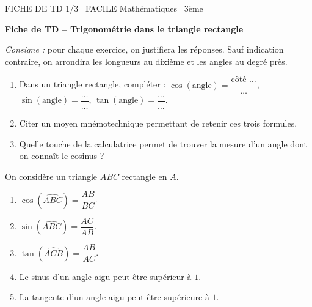 \documentclass[11pt]{article}
\begin{document}
\begin{tcolorbox}[enhanced,colback=popink,colframe=popink,arc=10pt,boxrule=0pt,left=12pt,right=12pt,top=9pt,bottom=9pt]
{\color{white}\popxbold\small FICHE DE TD 1/3 \textbullet\ FACILE \hfill Mathématiques \textbullet\ 3ème\par}
\end{tcolorbox}
\vspace{4pt}
\textbf{Fiche de TD -- Trigonométrie dans le triangle rectangle}

\emph{Consigne :} pour chaque exercice, on justifiera les réponses. Sauf indication contraire, on arrondira les longueurs au dixième et les angles au degré près.

\begin{exercice}
\begin{enumerate}
  \item Dans un triangle rectangle, compléter : $\cos(\text{angle}) = \dfrac{\text{côté \ldots}}{\text{\ldots}}$, $\sin(\text{angle}) = \dfrac{\text{\ldots}}{\text{\ldots}}$, $\tan(\text{angle}) = \dfrac{\text{\ldots}}{\text{\ldots}}$.
  \item Citer un moyen mnémotechnique permettant de retenir ces trois formules.
  \item Quelle touche de la calculatrice permet de trouver la mesure d'un angle dont on connaît le cosinus ?
\end{enumerate}
\end{exercice}

\begin{exercice}
On considère un triangle $ABC$ rectangle en $A$.
\begin{enumerate}
  \item $\cos(\widehat{ABC}) = \dfrac{AB}{BC}$.
  \item $\sin(\widehat{ABC}) = \dfrac{AC}{AB}$.
  \item $\tan(\widehat{ACB}) = \dfrac{AB}{AC}$.
  \item Le sinus d'un angle aigu peut être supérieur à $1$.
  \item La tangente d'un angle aigu peut être supérieure à $1$.
\end{enumerate}
\end{exercice}
\end{document}
